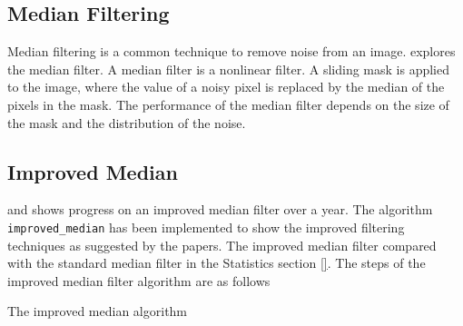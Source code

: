 \documentclass{article}
\begin{document}
\subsection{Median Filtering}
\label{subsec:median-filter}
%
Median filtering is a common technique to remove noise from an
image. \cite{Med2012} explores the median filter. A median filter is a
nonlinear filter. A sliding mask is applied to the image, where the
value of a noisy pixel is replaced by the median of the pixels in
the mask. The performance of the median filter depends on the size
of the mask and the distribution of the noise.

\subsection{Improved Median}
\label{subsec:improved-median}
\cite{improved-median} and \cite{Med2012} shows progress on an
improved median filter over a year. The algorithm
\texttt{improved\_median} has been implemented to show the improved
filtering techniques as suggested by the papers. The improved
median filter compared with
the standard median filter in the Statistics section \ref{}. The steps of
the improved median filter algorithm are as
follows \par
\begin{algorithm}[H]
  \caption{The improved median algorithm}
\end{algorithm}
%
\end{document}
